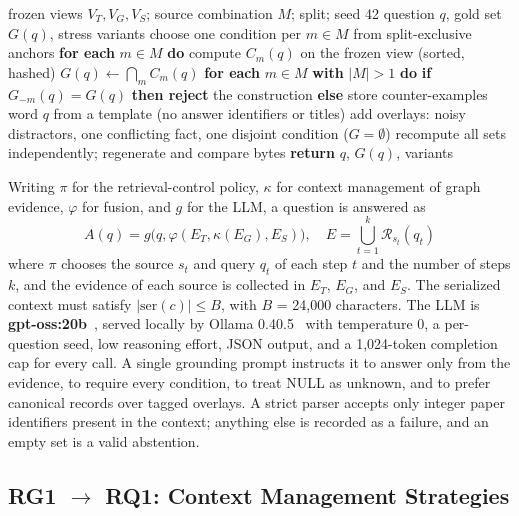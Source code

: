 \documentclass[conference]{IEEEtran}
\begin{document}
\begin{algorithm}[!t]
\caption{Verified multi-source question construction}
\label{alg:bench}
\begin{algorithmic}[1]
\Require frozen views $V_T,V_G,V_S$; source combination $M$; split; seed 42
\Ensure question $q$, gold set $G(q)$, stress variants
\State choose one condition per $m\in M$ from split-exclusive anchors
\State \textbf{for each} $m\in M$ \textbf{do} compute $C_m (q)$ on the frozen view (sorted, hashed)
\State $G(q)\leftarrow \bigcap _m C_m (q)$
\State \textbf{for each} $m\in M$ \textbf{with} $|M|>1$ \textbf{do}
\State \hspace*{1\algorithmicindent}\textbf{if} $G_{-m} (q)=G(q)$ \textbf{then reject} the construction \textbf{else} store counter-examples
\State word $q$ from a template (no answer identifiers or titles)
\State add overlays: noisy distractors, one conflicting fact, one disjoint condition ($G=\emptyset$)
\State recompute all sets independently; regenerate and compare bytes
\State \textbf{return} $q$, $G(q)$, variants
\end{algorithmic}
\end{algorithm}

Writing $\pi$ for the retrieval-control policy, $\kappa$ for context management of graph evidence, $\varphi$ for fusion, and $g$ for the LLM, a question is answered as
\begin{equation}
A(q)=g\bigl(q,\varphi(E_T,\kappa(E_G),E_S)\bigr),\quad E=\bigcup_{t=1}^{k}\mathcal{R}_{s_t}(q_t)
\label{eq:pipeline}
\end{equation}
where $\pi$ chooses the source $s_t$ and query $q_t$ of each step $t$ and the number of steps $k$, and the evidence of each source is collected in $E_T$, $E_G$, and $E_S$. The serialized context must satisfy $|{\text{ser}}(c)|\le B$, with $B$ = 24,000 characters. The LLM is \textbf{gpt-oss:20b}~\cite{openai2025gptoss}, served locally by Ollama 0.40.5~\cite{ollama} with temperature 0, a per-question seed, low reasoning effort, JSON output, and a 1,024-token completion cap for every call. A single grounding prompt instructs it to answer only from the evidence, to require every condition, to treat NULL as unknown, and to prefer canonical records over tagged overlays. A strict parser accepts only integer paper identifiers present in the context; anything else is recorded as a failure, and an empty set is a valid abstention.

\subsection{RG1 $\rightarrow$ RQ1: Context Management Strategies}\label{sec:cm}
\end{document}
